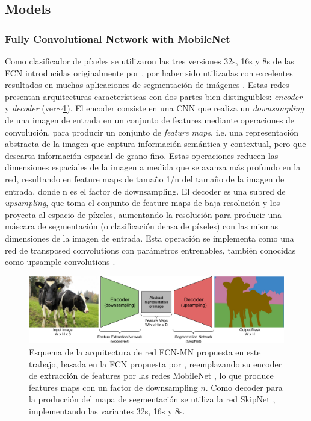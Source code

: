\documentclass[a4paper,authoryear,review]{elsarticle}
\begin{document}
\subsection{Models}
\subsubsection{Fully Convolutional Network with MobileNet} 
\label{sec:fcn}

Como clasificador de píxeles se utilizaron las tres versiones 32s, 16s y 8s de las FCN  introducidas originalmente por \citet{long2015fully}, por haber sido utilizadas con excelentes resultados en muchas aplicaciones de segmentación de imágenes \cite{litjens2017survey, garcia2018survey, kaymak2019brief}. Estas redes presentan arquitecturas características con dos partes bien distinguibles: \emph{encoder} y \emph{decoder} (ver$\sim$\ref{fig:FCN-MN}). 
%
El encoder consiste en una CNN que realiza un \emph{downsampling} de una imagen de entrada en un conjunto de features mediante operaciones de convolución, para producir un conjunto de \emph{feature maps}, i.e. una representación abstracta de la imagen que captura información semántica y contextual, pero que descarta información espacial de grano fino. Estas operaciones reducen las dimensiones espaciales de la imagen a medida que se avanza más profundo en la red, resultando en feature maps de tamaño 1/n del tamaño de la imagen de entrada, donde n es el factor de downsampling. El decoder es una subred de \emph{upsampling}, que toma el conjunto de feature maps de baja resolución y los proyecta al espacio de píxeles, aumentando la resolución para producir una máscara de segmentación (o clasificación densa de píxeles) con las mismas dimensiones de la imagen de entrada. Esta operación se implementa como una red de transposed convolutions con parámetros entrenables, también conocidas como upsample convolutions \citet{shelhamer2017fully}. 



\begin{figure}
    \centering
    \includegraphics[width=12cm]{figures/Figure1.png}
    \caption{Esquema de la arquitectura de red FCN-MN propuesta en este trabajo, basada en la FCN propuesta por \citet{shelhamer2017fully}, reemplazando su encoder de extracción de features por las redes MobileNet \cite{howard2017mobilenets}, lo que produce features maps con un factor de downsampling $n$. Como decoder para la producción  del mapa de segmentación se utiliza la red SkipNet \cite{siam2018rtseg}, implementando las variantes 32s, 16s y 8s.}
    \label{fig:FCN-MN}
\end{figure}
\end{document}
